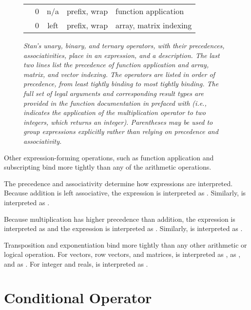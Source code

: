 \begin{figure}
\begin{center}
\begin{tabular}{c|ccl|l}
\\ \hline \hline
\code{()} & 0 & n/a & prefix, wrap & function application
\\
\code{[]} & 0 & left & prefix, wrap & array, matrix indexing
\end{tabular}
\end{center}
\caption{\small\it Stan's unary, binary, and ternary operators, with their
  precedences, associativities, place in an expression, and a
  description.  The last two lines list the precedence of function
  application and array, matrix, and vector indexing. The operators are
  listed in order of precedence, from least tightly binding to most
  tightly binding.  The full set of legal arguments and corresponding
  result types are provided in the function documentation in
   prefaced with  (i.e.,
   indicates the application of the
  multiplication operator to two integers, which returns an integer).
  Parentheses may be used to group expressions explicitly rather than
  relying on precedence and
  associativity.}\label{operator-precedence.figure}
\end{figure}
%
Other expression-forming operations, such as function application and
subscripting bind more tightly than any of the arithmetic operations.

The precedence and associativity determine how expressions are
interpreted.  Because addition is left associative, the expression
\mbox{} is interpreted as \mbox{}.  Similarly,
\mbox{} is interpreted as \mbox{}.

Because multiplication has higher precedence than addition, the
expression \mbox{} is interpreted as \mbox{} and the
expression \mbox{} is interpreted as \mbox{}.  Similarly,
\mbox{} is interpreted as \mbox{}.

Transposition and exponentiation bind more tightly
than any other arithmetic or logical operation.
For vectors, row vectors, and matrices,
\mbox{} is interpreted as \mbox{}, \mbox{} as
\mbox{}, and \mbox{} as \mbox{}.
For integer and reals,
\mbox{}
is interpreted as \mbox{}.


\section{Conditional Operator}\label{conditional-operator.section}

